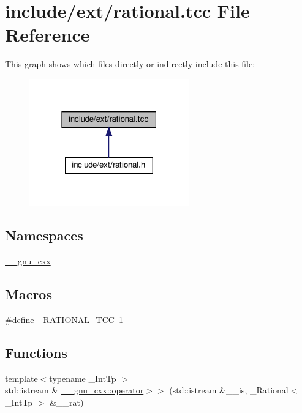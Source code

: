\hypertarget{rational_8tcc}{}\section{include/ext/rational.tcc File Reference}
\label{rational_8tcc}
This graph shows which files directly or indirectly include this file\+:\nopagebreak
\begin{figure}[H]
\begin{center}
\leavevmode
\includegraphics[width=195pt]{rational_8tcc__dep__incl}
\end{center}
\end{figure}
\subsection*{Namespaces}
\begin{DoxyCompactItemize}
\item 
 \hyperlink{namespace____gnu__cxx}{\+\_\+\+\_\+gnu\+\_\+cxx}
\end{DoxyCompactItemize}
\subsection*{Macros}
\begin{DoxyCompactItemize}
\item 
\#define \hyperlink{rational_8tcc_acb573abc7ba2dc6724bfd4f001112471}{\+\_\+\+R\+A\+T\+I\+O\+N\+A\+L\+\_\+\+T\+CC}~1
\end{DoxyCompactItemize}
\subsection*{Functions}
\begin{DoxyCompactItemize}
\item 
{\footnotesize template$<$typename \+\_\+\+Int\+Tp $>$ }\\std\+::istream \& \hyperlink{namespace____gnu__cxx_a65f7d9a485c3c779aca0f5fb3e807b55}{\+\_\+\+\_\+gnu\+\_\+cxx\+::operator$>$$>$} (std\+::istream \&\+\_\+\+\_\+is, \+\_\+\+Rational$<$ \+\_\+\+Int\+Tp $>$ \&\+\_\+\+\_\+rat)
\end{DoxyCompactItemize}


